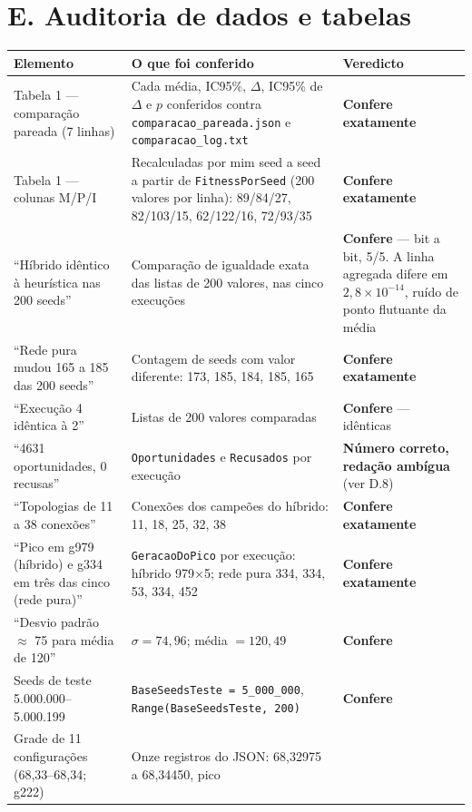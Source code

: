 \documentclass[11pt,a4paper]{article}
\begin{document}
\section*{E. Auditoria de dados e tabelas}

\begin{longtable}{|p{3.6cm}|p{6.6cm}|p{4.4cm}|}
\hline
\textbf{Elemento} & \textbf{O que foi conferido} & \textbf{Veredicto} \\
\hline
\endhead
Tabela 1 --- comparação pareada (7 linhas) & Cada média, IC95\%, $\Delta$, IC95\% de $\Delta$ e $p$
conferidos contra \texttt{comparacao\_pareada.json} e \texttt{comparacao\_log.txt} &
\textbf{Confere exatamente} \\
\hline
Tabela 1 --- colunas M/P/I & Recalculadas por mim seed a seed a partir de
\texttt{FitnessPorSeed} (200 valores por linha): 89/84/27, 82/103/15, 62/122/16, 72/93/35 &
\textbf{Confere exatamente} \\
\hline
``Híbrido idêntico à heurística nas 200 seeds'' & Comparação de igualdade exata das listas de 200
valores, nas cinco execuções &
\textbf{Confere} --- bit a bit, 5/5. A linha agregada difere em $2{,}8\times10^{-14}$, ruído de
ponto flutuante da média \\
\hline
``Rede pura mudou 165 a 185 das 200 seeds'' & Contagem de seeds com valor diferente: 173, 185, 184,
185, 165 & \textbf{Confere exatamente} \\
\hline
``Execução 4 idêntica à 2'' & Listas de 200 valores comparadas & \textbf{Confere} --- idênticas \\
\hline
``4631 oportunidades, 0 recusas'' & \texttt{Oportunidades} e \texttt{Recusados} por execução &
\textbf{Número correto, redação ambígua} (ver D.8) \\
\hline
``Topologias de 11 a 38 conexões'' & Conexões dos campeões do híbrido: 11, 18, 25, 32, 38 &
\textbf{Confere exatamente} \\
\hline
``Pico em g979 (híbrido) e g334 em três das cinco (rede pura)'' & \texttt{GeracaoDoPico} por
execução: híbrido 979$\times$5; rede pura 334, 334, 53, 334, 452 & \textbf{Confere exatamente} \\
\hline
``Desvio padrão $\approx$ 75 para média de 120'' & $\sigma = 74{,}96$; média $= 120{,}49$ &
\textbf{Confere} \\
\hline
Seeds de teste 5.000.000--5.000.199 & \texttt{BaseSeedsTeste = 5\_000\_000},
\texttt{Range(BaseSeedsTeste, 200)} & \textbf{Confere} \\
\hline
Grade de 11 configurações (68,33--68,34; g222) & Onze registros do JSON: 68,32975 a 68,34450, pico

\end{longtable}
\end{document}
